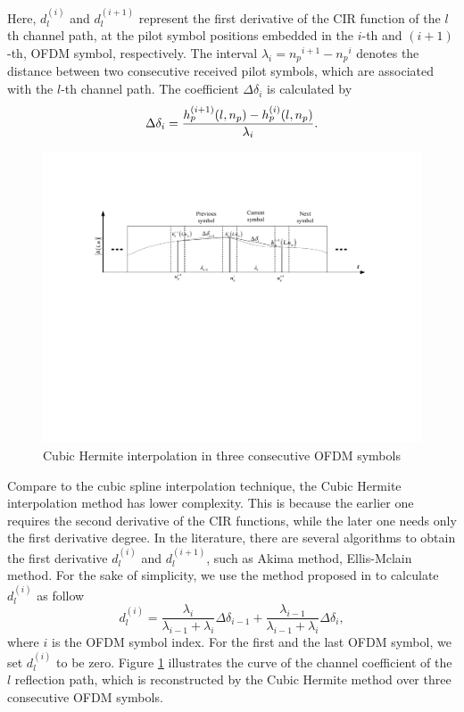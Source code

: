 \documentclass[AMA]{WileyNJD-v1}
\begin{document}
{{Here, $d^{(i)}_{l}$ and $d^{(i+1)}_{l}$ represent the first derivative of the CIR function of the $l$th channel path,  at the pilot symbol positions embedded in the  $i$-th and $(i+1)$-th, OFDM symbol, respectively. The interval ${\lambda_{i}} = {n_p}^{i+1}-{n_p}^{i} $ denotes the distance between two consecutive received pilot symbols, which are associated with the  $l$-th channel path. The coefficient ${\Delta {\delta _i}}$ is calculated by
%
\begin{equation*}
	\centering
	\Delta {\delta _i} =\frac{h^{(i+1)}_{p}(l,n_p) - h^{(i)}_{p}(l,n_p)}{\lambda_{i}}.
\end{equation*}
%
\begin{figure}
		\centering
		\includegraphics[width=1.0\linewidth]{figures/derivative_cubic_hermite}
		\caption{Cubic Hermite interpolation in three consecutive OFDM symbols}
		\label{fig:derivativecubichermite}
\end{figure}	
%			
Compare to the cubic spline interpolation technique, the Cubic Hermite interpolation method has lower complexity. This is because the earlier one requires the second derivative of the CIR functions, while the later one needs only the first derivative degree. 
In the literature, there are several algorithms to obtain the first derivative $d^{(i)}_{l}$ and $d^{(i+1)}_{l}$, such as  Akima method, Ellis-Mclain method. For the sake of simplicity, we use the method proposed in \cite{ Fritsch1980} to calculate $d^{(i)}_{l}$ as follow
%
\begin{equation}
d^{(i)}_{l} = \dfrac{\lambda_{i}}{\lambda_{i-1}+\lambda_{i}}{\Delta {\delta _{i-1}}} + \dfrac{\lambda_{i-1}}{\lambda_{i-1}+\lambda_{i}}{\Delta {\delta _i}}, 	
\end{equation}
where $i$ is the  OFDM symbol index. For the first and the last OFDM symbol, we set $d^{(i)}_{l}$ to be zero. Figure \ref{fig:derivativecubichermite} illustrates the curve of the  channel coefficient of the $l$ reflection path, which is reconstructed by the Cubic Hermite method over three consecutive OFDM symbols.

}}
\end{document}
